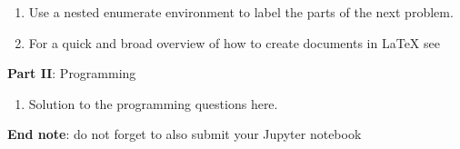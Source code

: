\documentclass[12pt]{article}
\begin{document}
\begin{enumerate}
    \item Use a nested enumerate environment to label the parts of the next problem.
    \item For a quick and broad overview of how to create documents in {\LaTeX} see 
\end{enumerate}

\newpage

\large{\textbf{Part II}: Programming}\normalsize

\begin{enumerate}[leftmargin=\labelsep,resume]
\item Solution to the programming questions here.
\end{enumerate}

\vskip 1cm
\textbf{End note}: do not forget to also submit your Jupyter notebook
\end{document}
